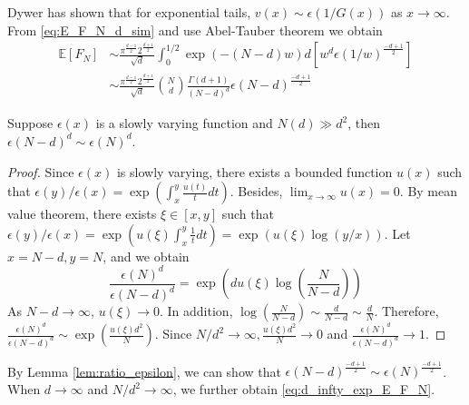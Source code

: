 \documentclass{aptpub}
\def\E{\mathbb{E}}
\begin{document}
Dywer has shown that for exponential tails, $v(x) \sim \epsilon(1/G(x))$ as $x\to \infty$.
From \eqref{eq:E_F_N_d_sim}
and use Abel-Tauber theorem
\cite{omey1989abelian} we obtain
\begin{align*}
    \E[F_N] & \sim \frac{\pi^{\frac{d-1}{2}} 2^{\frac{d+1}{2}}}{\sqrt{d}}\int_0^{1/2} \exp(-(N-d)w) d[w^d \epsilon(1/w)^{\frac{-d+1}{2}}] \\
    &\sim \frac{\pi^{\frac{d-1}{2}} 2^{\frac{d+1}{2}}}{\sqrt{d}} \binom{N}{d}\frac{\Gamma(d+1)}{(N-d)^d} \epsilon(N-d)^{\frac{-d+1}{2}}
\end{align*}

\begin{lemma}\label{lem:ratio_epsilon}
     Suppose $\epsilon(x)$ is a slowly varying function
     and $N(d)\gg d^2$,
     then $\epsilon(N-d)^{d} \sim \epsilon(N)^d$.
\end{lemma}
\begin{proof}
     Since $\epsilon(x)$ is slowly varying, there exists
     a bounded function $u(x)$ such that
     $\epsilon(y)/\epsilon(x)=\exp(\int_{x}^y \frac{u(t)}{t}dt)$.
     Besides, $\lim_{x\to \infty} u(x) = 0$.
     By mean value theorem, there exists $\xi \in [x,y]$ such that
     $\epsilon(y)/\epsilon(x)=\exp(u(\xi)\int_{x}^y \frac{1}{t}dt)
     =\exp(u(\xi)\log(y/x))$. Let $x=N-d, y=N$, and we obtain
     \begin{equation*}
          \frac{\epsilon(N)^d}{\epsilon(N-d)^d}
          = \exp(d u(\xi) \log(\frac{N}{N-d}))
     \end{equation*}
     As $N-d\to \infty$, $u(\xi)\to 0$. In addition,
     $\log(\frac{N}{N-d}) \sim \frac{d}{N-d} \sim \frac{d}{N}$.
     Therefore,
     $\frac{\epsilon(N)^d}{\epsilon(N-d)^d}\sim \exp(\frac{u(\xi)d^2}{N})
     $. Since $N/d^2 \to \infty, \frac{u(\xi)d^2}{N} \to 0$ and
     $\frac{\epsilon(N)^d}{\epsilon(N-d)^d}\to 1$.
\end{proof}
By Lemma \ref{lem:ratio_epsilon}, we can show that
$\epsilon(N-d)^{\frac{-d+1}{2}}\sim \epsilon(N)^{\frac{-d+1}{2}}$.
When $d\to\infty$ and $N/d^2\to \infty$, we further obtain \eqref{eq:d_infty_exp_E_F_N}.
 
\end{document}
